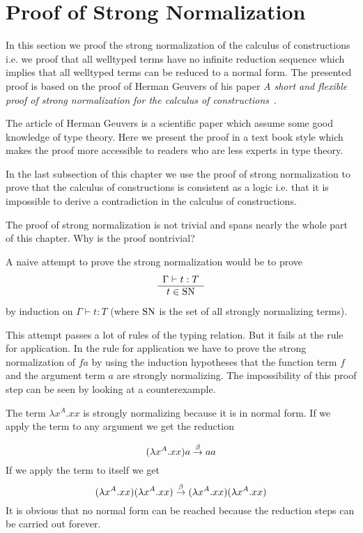 \section{Proof of Strong Normalization}

In this section we proof the strong normalization of the calculus of
constructions i.e. we proof that all welltyped terms have no infinite reduction
sequence which implies that all welltyped terms can be reduced to a normal
form. The presented proof is based on the proof of Herman Geuvers of his paper
\emph{A short and flexible proof of strong normalization for the calculus of
constructions}~\cite{geuvers1994}.

The article of Herman Geuvers is a scientific
paper which assume some good knowledge of type theory. Here we present the proof
in a text book style which makes the proof more accessible to readers who are
less experts in type theory.


In the last subsection of this chapter we use the proof of strong normalization
to prove that the calculus of constructions is consistent as a logic i.e. that
it is impossible to derive a contradiction in the calculus of constructions.

The proof of strong normalization is not trivial and spans nearly the whole part
of this chapter. Why is the proof nontrivial?

A naive attempt to prove the strong normalization would be to prove
$$
    \begin{array}{c} 
        \Gamma \vdash t : T
     \\ \hline  t \in \text{SN} \end{array}
$$
by induction on $\Gamma \vdash t : T$ (where $\text{SN}$ is the set of all strongly
normalizing terms).

This attempt passes a lot of rules of the typing relation. But it fails at the
rule for application. In the rule for application we have to prove the strong
normalization of $f a$ by using the induction hypotheses that the function term
$f$ and the argument term $a$ are strongly normalizing. The impossibility of
this proof step can be seen by looking at a counterexample.

The term $\lambda x^A. x x$ is strongly normalizing because it is in normal
form. If we apply the term to any argument we get the reduction

$$
    (\lambda x^A. x x) a \stackrel{\beta}{\to} a a
$$
%
If we apply the term to itself we get
%
$$
    (\lambda x^A. x x) (\lambda x^A. x x)
    \stackrel{\beta}{\to}
    (\lambda x^A. x x) (\lambda x^A. x x)
$$
%
It is obvious that no normal form can be reached because the reduction steps can
be carried out forever.

